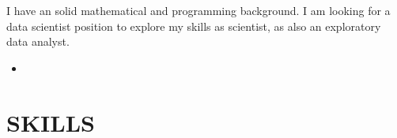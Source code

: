 \documentclass[12pt,a4paper,sans]{moderncv}        %
\begin{document}
\vspace{6pt}
I have an solid mathematical and programming background. I am looking for a data scientist position to explore my skills as scientist, as also an exploratory data analyst. 
\begin{itemize}
\item {}

\vspace{6pt}
%
%
%

\end{itemize}


\section{SKILLS}
\end{document}
